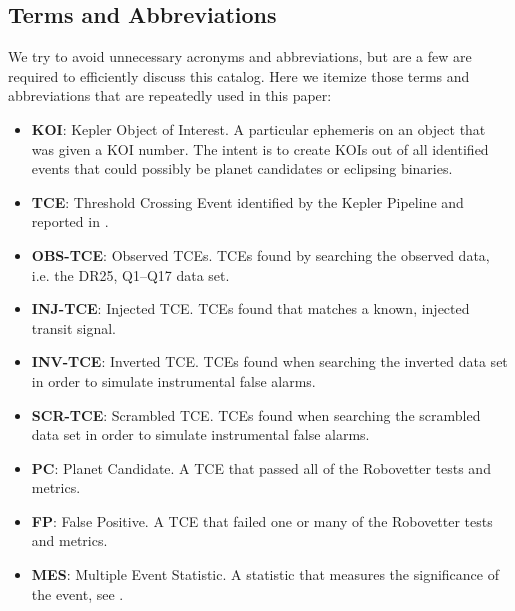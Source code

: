 \subsection{Terms and Abbreviations}
\label{abbrev}
We try to avoid unnecessary acronyms and abbreviations, but are a few are required to efficiently discuss this catalog.  Here we itemize those terms and abbreviations that are repeatedly used in this paper:

\begin{itemize}
\item[] \textbf{KOI}: Kepler Object of Interest. A particular ephemeris on an object that was given a KOI number. The intent is to create KOIs out of all identified events that could possibly be planet candidates or eclipsing binaries.  
\item[] \textbf{TCE}: Threshold Crossing Event identified by the Kepler Pipeline and reported in \citet{Twicken2016}.
\item[] \textbf{OBS-TCE}: Observed TCEs. TCEs found by searching the observed data, i.e. the DR25, Q1--Q17 data set.
\item[] \textbf{INJ-TCE}: Injected TCE. TCEs found that matches a known, injected transit signal.
\item[] \textbf{INV-TCE}: Inverted TCE. TCEs found when searching the inverted data set in order to simulate instrumental false alarms.
\item[] \textbf{SCR-TCE}: Scrambled TCE. TCEs found when searching the scrambled data set in order to simulate instrumental false alarms.
\item[] \textbf{PC}: Planet Candidate. A TCE that passed all of the Robovetter tests and metrics.
\item[] \textbf{FP}: False Positive. A TCE that failed one or many of the Robovetter tests and metrics.
\item[] \textbf{MES}: Multiple Event Statistic. A statistic that measures the significance of the event, see \citep{Jenkins2002a}.

\end{itemize}
